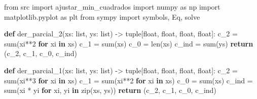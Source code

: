\documentclass[
  letterpaper,
  DIV=11,
  numbers=noendperiod]{scrartcl}
\newenvironment{Shaded}{\begin{snugshade}}{\end{snugshade}}
\newcommand{\BuiltInTok}[1]{\textcolor[rgb]{0.00,0.23,0.31}{#1}}
\newcommand{\ControlFlowTok}[1]{\textcolor[rgb]{0.00,0.23,0.31}{\textbf{#1}}}
\newcommand{\DecValTok}[1]{\textcolor[rgb]{0.68,0.00,0.00}{#1}}
\newcommand{\ImportTok}[1]{\textcolor[rgb]{0.00,0.46,0.62}{#1}}
\newcommand{\KeywordTok}[1]{\textcolor[rgb]{0.00,0.23,0.31}{\textbf{#1}}}
\newcommand{\NormalTok}[1]{\textcolor[rgb]{0.00,0.23,0.31}{#1}}
\newcommand{\OperatorTok}[1]{\textcolor[rgb]{0.37,0.37,0.37}{#1}}
\begin{document}
\begin{Shaded}
\begin{Highlighting}[]
\ImportTok{from}\NormalTok{ src }\ImportTok{import}\NormalTok{ ajustar\_min\_cuadrados}
\ImportTok{import}\NormalTok{ numpy }\ImportTok{as}\NormalTok{ np}
\ImportTok{import}\NormalTok{ matplotlib.pyplot }\ImportTok{as}\NormalTok{ plt}
\ImportTok{from}\NormalTok{ sympy }\ImportTok{import}\NormalTok{ symbols, Eq, solve}

\KeywordTok{def}\NormalTok{ der\_parcial\_2(xs: }\BuiltInTok{list}\NormalTok{, ys: }\BuiltInTok{list}\NormalTok{) }\OperatorTok{{-}\textgreater{}} \BuiltInTok{tuple}\NormalTok{[}\BuiltInTok{float}\NormalTok{, }\BuiltInTok{float}\NormalTok{, }\BuiltInTok{float}\NormalTok{, }\BuiltInTok{float}\NormalTok{]:}
\NormalTok{    c\_2 }\OperatorTok{=} \BuiltInTok{sum}\NormalTok{(xi}\OperatorTok{**}\DecValTok{2} \ControlFlowTok{for}\NormalTok{ xi }\KeywordTok{in}\NormalTok{ xs)}
\NormalTok{    c\_1 }\OperatorTok{=} \BuiltInTok{sum}\NormalTok{(xs)}
\NormalTok{    c\_0 }\OperatorTok{=} \BuiltInTok{len}\NormalTok{(xs)}
\NormalTok{    c\_ind }\OperatorTok{=} \BuiltInTok{sum}\NormalTok{(ys)}
    \ControlFlowTok{return}\NormalTok{ (c\_2, c\_1, c\_0, c\_ind)}


\KeywordTok{def}\NormalTok{ der\_parcial\_1(xs: }\BuiltInTok{list}\NormalTok{, ys: }\BuiltInTok{list}\NormalTok{) }\OperatorTok{{-}\textgreater{}} \BuiltInTok{tuple}\NormalTok{[}\BuiltInTok{float}\NormalTok{, }\BuiltInTok{float}\NormalTok{, }\BuiltInTok{float}\NormalTok{, }\BuiltInTok{float}\NormalTok{]:}
\NormalTok{    c\_2 }\OperatorTok{=} \BuiltInTok{sum}\NormalTok{(xi}\OperatorTok{**}\DecValTok{3} \ControlFlowTok{for}\NormalTok{ xi }\KeywordTok{in}\NormalTok{ xs)}
\NormalTok{    c\_1 }\OperatorTok{=} \BuiltInTok{sum}\NormalTok{(xi}\OperatorTok{**}\DecValTok{2} \ControlFlowTok{for}\NormalTok{ xi }\KeywordTok{in}\NormalTok{ xs)}
\NormalTok{    c\_0 }\OperatorTok{=} \BuiltInTok{sum}\NormalTok{(xs)}
\NormalTok{    c\_ind }\OperatorTok{=} \BuiltInTok{sum}\NormalTok{(xi }\OperatorTok{*}\NormalTok{ yi }\ControlFlowTok{for}\NormalTok{ xi, yi }\KeywordTok{in} \BuiltInTok{zip}\NormalTok{(xs, ys))}
    \ControlFlowTok{return}\NormalTok{ (c\_2, c\_1, c\_0, c\_ind)}



\end{Highlighting}
\end{Shaded}
\end{document}
